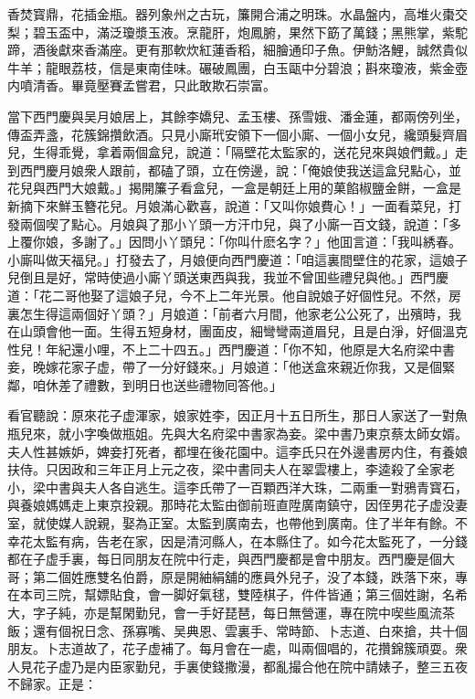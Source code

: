 香焚寳鼎，花插金瓶。器列象州之古玩，簾開合浦之明珠。水晶盤内，高堆火棗交梨；碧玉盃中，滿泛瓊漿玉液。烹龍肝，炮鳳腑，果然下筯了萬錢；黑熊掌，紫駝蹄，酒後獻來香滿座。更有那軟炊紅蓮香稻，細膾通印子魚。伊魴洛鯉，誠然貴似牛羊；龍眼荔枝，信是東南佳味。碾破鳳團，白玉甌中分碧浪；斟來瓊液，紫金壺内噴清香。畢竟壓賽孟嘗君，只此敢欺石崇富。

當下西門慶與吴月娘居上，其餘李嬌兒、孟玉樓、孫雪娥、潘金蓮，都兩傍列坐，傳盃弄盞，花簇錦攢飲酒。只見小廝玳安領下一個小廝、一個小女兒，纔頭髮齊眉兒，生得乖覺，拿着兩個盒兒，說道：「隔壁花太監家的，送花兒來與娘們戴。」走到西門慶月娘衆人跟前，都磕了頭，立在傍邊，說：「俺娘使我送這盒兒點心，並花兒與西門大娘戴。」揭開簾子看盒兒，一盒是朝廷上用的菓餡椒鹽金餅，一盒是新摘下來鮮玉簪花兒。月娘滿心歡喜，說道：「又叫你娘費心！」一面看菜兒，打發兩個喫了點心。月娘與了那小丫頭一方汗巾兒，與了小廝一百文錢，說道：「多上覆你娘，多謝了。」因問小丫頭兒：「你叫什麽名字？」他囬言道：「我叫綉春。小廝叫做天福兒。」打發去了，月娘便向西門慶道：「咱這裏間壁住的花家，這娘子兒倒且是好，常時使過小廝丫頭送東西與我，我並不曾囬些禮兒與他。」西門慶道：「花二哥他娶了這娘子兒，今不上二年光景。他自說娘子好個性兒。不然，房裏怎生得這兩個好丫頭？」月娘道：「前者六月間，他家老公公死了，出殯時，我在山頭會他一面。生得五短身材，團面皮，細彎彎兩道眉兒，且是白淨，好個溫克性兒！年紀還小哩，不上二十四五。」西門慶道：「你不知，他原是大名府梁中書妾，晚嫁花家子虚，帶了一分好錢來。」月娘道：「他送盒來親近你我，又是個緊鄰，咱休差了禮數，到明日也送些禮物囘答他。」

看官聽說：原來花子虚渾家，娘家姓李，因正月十五日所生，那日人家送了一對魚瓶兒來，就小字喚做瓶姐。先與大名府梁中書家為妾。梁中書乃東京蔡太師女婿。夫人性甚嫉妒，婢妾打死者，都埋在後花園中。這李氏只在外邊書房内住，有養娘扶侍。只因政和三年正月上元之夜，梁中書同夫人在翠雲樓上，李逵殺了全家老小，梁中書與夫人各自逃生。這李氏帶了一百顆西洋大珠，二兩重一對鴉青寳石，與養娘媽媽走上東京投親。那時花太監由御前班直陞廣南鎮守，因侄男花子虚没妻室，就使媒人說親，娶為正室。太監到廣南去，也帶他到廣南。住了半年有餘。不幸花太監有病，告老在家，因是清河縣人，在本縣住了。如今花太監死了，一分錢都在子虚手裏，每日同朋友在院中行走，與西門慶都是會中朋友。西門慶是個大哥；第二個姓應雙名伯爵，原是開紬絹舖的應員外兒子，没了本錢，跌落下來，專在本司三院，幫嫖貼食，會一脚好氣毬，雙陸棋子，件件皆通；第三個姓謝，名希大，字子純，亦是幫閑勤兒，會一手好琵琶，每日無營運，專在院中喫些風流茶飯；還有個祝日念、孫寡嘴、吴典恩、雲裏手、常時節、卜志道、白來搶，共十個朋友。卜志道故了，花子虚補了。每月會在一處，叫兩個唱的，花攢錦簇頑耍。衆人見花子虚乃是内臣家勤兒，手裏使錢撒漫，都亂撮合他在院中請婊子，整三五夜不歸家。正是：

